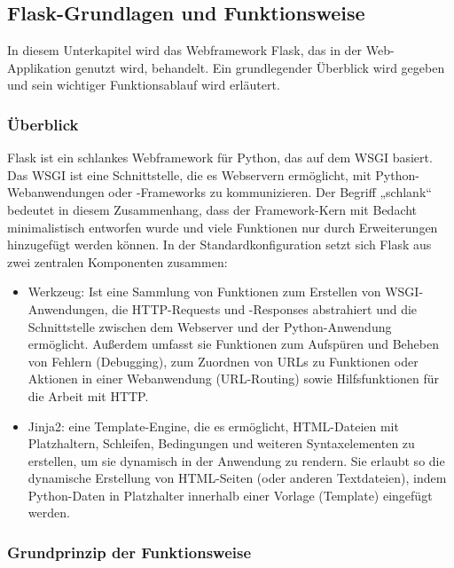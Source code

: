 \subsection{Flask-Grundlagen und Funktionsweise}\label{subsec:flask-grundlagen-und-funktionsweise}

In diesem Unterkapitel wird das Webframework Flask, das in der Web-Applikation genutzt wird, behandelt.
Ein grundlegender Überblick wird gegeben und sein wichtiger Funktionsablauf wird erläutert.

\subsubsection{Überblick}

Flask ist ein schlankes Webframework für Python, das auf dem \ac{WSGI} basiert.
Das \ac{WSGI} ist eine Schnittstelle, die es Webservern ermöglicht, mit Python-Webanwendungen oder -Frameworks zu kommunizieren.
Der Begriff „schlank“ bedeutet in diesem Zusammenhang, dass der Framework-Kern mit Bedacht minimalistisch entworfen wurde und viele Funktionen nur durch Erweiterungen hinzugefügt werden können.
In der Standardkonfiguration setzt sich Flask aus zwei zentralen Komponenten zusammen: \cite{FlaskDocumentation}
\begin{itemize}

    \item Werkzeug: Ist eine Sammlung von Funktionen zum Erstellen von WSGI-Anwendungen, die HTTP-Requests und -Responses abstrahiert und die Schnittstelle zwischen dem Webserver und der Python-Anwendung ermöglicht.  Außerdem umfasst sie Funktionen zum Aufspüren und Beheben von Fehlern (Debugging), zum Zuordnen von URLs zu Funktionen oder Aktionen in einer Webanwendung (URL-Routing) sowie Hilfsfunktionen für die Arbeit mit \ac{HTTP}.

    \item Jinja2: eine Template-Engine, die es ermöglicht, HTML-Dateien mit Platzhaltern, Schleifen, Bedingungen und weiteren Syntaxelementen zu erstellen, um sie dynamisch in der Anwendung zu rendern. Sie erlaubt so die dynamische Erstellung von HTML-Seiten (oder anderen Textdateien), indem Python-Daten in Platzhalter innerhalb einer Vorlage (Template) eingefügt werden.

\end{itemize}


\subsubsection{Grundprinzip der Funktionsweise}


